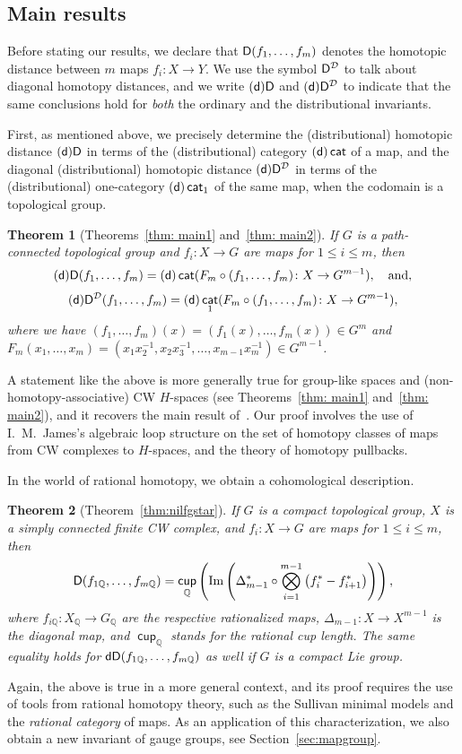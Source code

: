 \documentclass[amscd,amssymb,verbatim,10pt]{amsart}
\numberwithin{equation}{section}
\theoremstyle{plain}
\newtheorem{theorem}{Theorem}[section]
\theoremstyle{definition}
\DeclareMathOperator{\cat}{{\mathsf{cat}}}
\DeclareMathOperator{\cu}{{\mathsf{cup}}}
\def\Im{\protect\operatorname{Im}}
\def\Q{{\mathbb Q}}
\newcommand{\D}{{\sf {D}}}
\newcommand{\sd}{{(\sf {d})}}
\newcommand{\dD}{{\sf {dD}}}
\newcommand{\cD}{{\mathcal{D}}}
\begin{document}
\subsection*{Main results} 
Before stating our results, we declare that $\D(f_1,\dots,f_m)$ denotes the homotopic distance between $m$ maps $f_i\colon X\to Y$. We use the symbol $\D^{\cD}$ to talk about diagonal homotopy distances, and we write $\sd\D$ and $\sd\D^\cD$ to indicate that the same conclusions hold for \emph{both} the ordinary and the distributional invariants.

First, as mentioned above, we precisely determine the (distributional) homotopic distance $\sd\D$ in terms of the (distributional) category $\sd\cat$ of a map, and the diagonal (distributional) homotopic distance $\sd\D^\cD$ in terms of the (distributional) one-category $\sd\cat_1$ of the same map, when the codomain is a topological group.

\begin{theorem}[Theorems~\ref{thm: main1} and~\ref{thm: main2}]
    If $G$ is a path-connected topological group and $f_i\colon X\to G$ are maps 
for $1\le i \le m$, then
    \[
    \sd\D(f_1,\dots,f_m)=\sd\cat(F_m\circ (f_1,\ldots,f_m)\colon X\to G^{m-1}), \quad \text{and},
    \]
    \[
    \sd\D^{\cD}(f_1,\dots,f_m)=\sd\cat_1(F_m \circ (f_1,\ldots,f_m)\colon X\to G^{m-1}),
    \]
    where we have
$(f_1,\ldots,f_m)(x)= (f_1(x),\ldots,f_m(x)) \in G^m$ and $F_m(x_1,\dots,x_m)= (x_1x_2^{-1},x_2x_3^{-1},\dots,x_{m-1}x_m^{-1}) \in G^{m-1}$.
\end{theorem}
A statement like the above is more generally true for group-like spaces and (non-homotopy-associative) CW $H$-spaces (see Theorems~\ref{thm: main1} and~\ref{thm: main2}), and it recovers the main result of~\cite{LS}. Our proof involves the use of I.~M.~James's algebraic loop structure on the set of homotopy classes of maps from CW complexes to $H$-spaces, and the theory of homotopy pullbacks.


In the world of rational homotopy, we obtain a cohomological description.

\begin{theorem}[Theorem~\ref{thm:nilfgstar}]
    If $G$ is a compact topological group, $X$ is a simply connected finite CW complex, and $f_i\colon X\to G$ are maps for $1\le i \le m$, 
then
    \[
\D(f_{1\Q},\dots,f_{m\Q})=\cu_{\Q}\left(\Im\left(\Delta_{m-1}^*\circ 
\bigotimes_{i=1}^{m-1}\left(f_i^*-f_{i+1}^*\right)\right)
\right),
\]
where $f_{i\Q}\colon X_\Q \to G_\Q$ are the respective rationalized maps,  
$\Delta_{m-1}\colon X\to X^{m-1}$ is the diagonal map, and $\cu_\Q$ stands for the rational cup length. The same equality holds 
for $\dD(f_{1\Q},\dots,f_{m\Q})$ as well if $G$ is a compact Lie group.
\end{theorem}
Again, the above is true in a more general context, and its proof requires the use of tools from rational homotopy theory, such as the Sullivan 
minimal models and the \emph{rational category} of maps. As an application of this characterization, we also obtain a new invariant of gauge groups, see Section~\ref{sec:mapgroup}.
\end{document}

